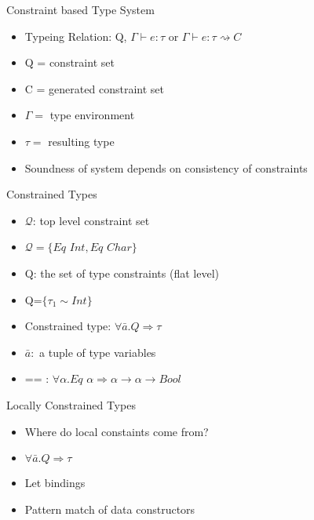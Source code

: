 \documentclass{beamer}
\begin{document}
\begin{frame}{Constraint based Type System}
\begin{itemize}
\item Typeing Relation: Q, $\Gamma \vdash e : \tau$ or $\Gamma \vdash e : \tau \rightsquigarrow C$
\item Q = constraint set
\item C = generated constraint set
\item $\Gamma=$ type environment
\item $\tau=$ resulting type
\item Soundness of system depends on consistency of constraints
\end{itemize}
\end{frame}

\begin{frame}{Constrained Types}
\begin{itemize}
\item $\mathcal{Q}$: top level constraint set
\item $\mathcal{Q}=\{Eq$ $Int, Eq$ $Char\}$
\end{itemize}
\begin{itemize}
\item Q: the set of type constraints (flat level)
\item Q=$\{\tau_1 \sim Int\}$
\end{itemize}
\begin{itemize}
\item Constrained type: $\forall \bar{a}. Q \Rightarrow \tau$
\item $\bar{a}:$ a tuple of type variables
\item == : $\forall \alpha. Eq$ $\alpha \Rightarrow \alpha \rightarrow \alpha \rightarrow Bool$
\end{itemize}
\end{frame}

\begin{frame}{Locally Constrained Types}
\begin{itemize}
\item Where do local constaints come from?
\item $\forall \bar{a}. Q \Rightarrow \tau$
\end{itemize}

\begin{itemize}
\item Let bindings
\item Pattern match of data constructors
\end{itemize}
\end{frame}
\end{document}
